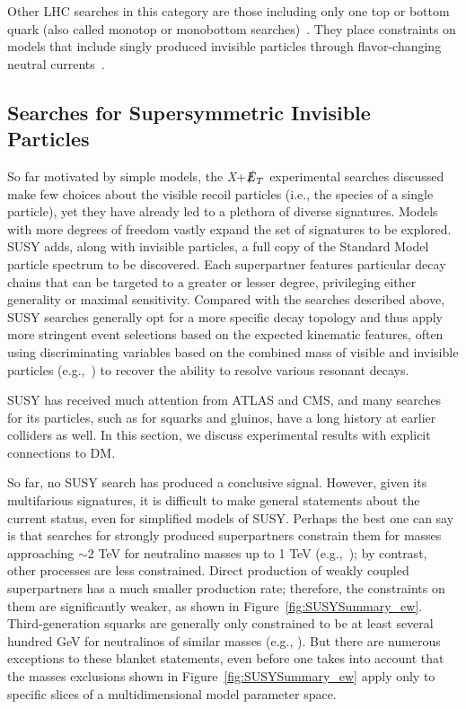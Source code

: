 \documentclass{ar-1col}
\newcommand{\IP}{invisible particle}
\newcommand{\MET}{\ensuremath{\slashed{E}_T}\xspace}
\begin{document}
{Other LHC searches in this category are those including only
one top or bottom quark (also called monotop or monobottom
searches)~\cite{Sirunyan:2018gka, Aad:2014wza}. They place
constraints on models that include singly produced {\IP}s through
flavor-changing neutral currents~\cite{Boucheneb:2014wza}.

\subsection{Searches for Supersymmetric Invisible Particles}\label{sec:results_SUSYSearches}

So far motivated by simple models, the \textit{X}+\MET experimental
searches discussed make few choices about the visible recoil
particles (i.e., the species of a single particle), yet they have
already led to a plethora of diverse signatures. Models with more degrees of freedom vastly expand the set of
signatures to be explored. SUSY adds, along with
{\IP}s, a full copy of the Standard Model particle
spectrum to be discovered. Each superpartner features particular decay chains that
can be targeted to a greater or lesser degree, privileging either
generality or maximal sensitivity. Compared with the 
searches described above, SUSY searches generally opt for a more specific
decay topology and thus apply more stringent event selections
based on the expected kinematic features, often using
discriminating variables based on the combined mass of visible and
invisible particles (e.g.,~) to recover
the ability to resolve various resonant decays.

SUSY has received much attention from ATLAS and CMS, and many
searches for its particles, such as for squarks and gluinos, have
a long history at earlier colliders as well. In this section, we
discuss experimental results with explicit connections to DM.

So far, no SUSY search has produced a conclusive signal. However,
given its multifarious signatures, it is difficult to make general
statements about the current status, even for simplified models of
SUSY. Perhaps the best one can say is that searches for
strongly produced superpartners constrain them for masses
approaching $\sim$2 TeV for neutralino masses up to 1 TeV
(e.g.,~); by contrast, other processes are
less constrained. Direct production of weakly coupled
superpartners has a much smaller production rate; therefore, the
constraints on them are significantly weaker, as shown in Figure~\ref{fig:SUSYSummary_ew}.
Third-generation squarks are generally only constrained to be at least several
hundred GeV for neutralinos of similar masses (e.g., ). But there are
numerous exceptions to these blanket statements, even before one
takes into account that the masses exclusions shown in Figure~\ref{fig:SUSYSummary_ew} 
apply only to specific slices of a multidimensional model parameter
space.

}
\end{document}

